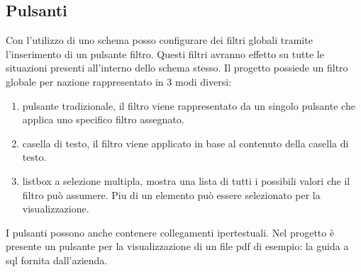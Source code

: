 \documentclass[target=bach,aauheader=,style=]{thud}
\begin{document}
\subsection{Pulsanti}


Con l'utilizzo di uno schema posso configurare dei filtri globali tramite l'inserimento di un pulsante filtro. 
Questi filtri avranno effetto su tutte le situazioni presenti all'interno dello schema stesso.
Il progetto possiede un filtro globale per nazione rappresentato in 3 modi diversi:


\begin{enumerate}
    \item pulsante tradizionale, il filtro viene rappresentato da un singolo pulsante che applica uno specifico filtro assegnato.
    \item casella di testo, il filtro viene applicato in base al contenuto della casella di testo. 
    \item listbox a selezione multipla, mostra una lista di tutti i possibili valori che il filtro può assumere. Piu di un elemento può essere selezionato per la visualizzazione.
\end{enumerate}

I pulsanti possono anche contenere collegamenti ipertestuali. 
Nel progetto è presente un pulsante per la visualizzazione di un file pdf di esempio: la guida a sql fornita dall'azienda.
\end{document}
